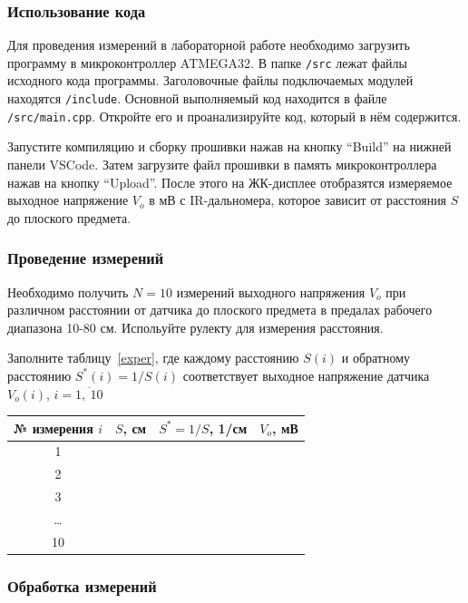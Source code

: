 \documentclass[12pt]{article}
\begin{document}
\subsubsection{Использование кода}

Для проведения измерений в лабораторной работе необходимо загрузить программу в микроконтроллер ATMEGA32. В папке \texttt{/src} лежат файлы исходного кода программы. Заголовочные файлы подключаемых модулей находятся \texttt{/include}. Основной выполняемый код находится в файле \texttt{/src/main.cpp}. Откройте его и проанализируйте код, который в нём содержится.

Запустите компиляцию и сборку прошивки нажав на кнопку ``Build'' на нижней панели VSCode. Затем загрузите файл прошивки в память микроконтроллера нажав на кнопку ``Upload''. После этого на ЖК-дисплее отобразятся измеряемое выходное напряжение \(V_o\) в мВ с IR-дальномера, которое зависит от расстояния \(S\) до плоского предмета.

\subsubsection{Проведение измерений}
Необходимо получить \(N=10\) измерений выходного напряжения \(V_o\) при различном расстоянии от датчика до плоского предмета в предалах рабочего диапазона 10-80 см. Испольуйте рулекту для измерения расстояния.

Заполните таблицу~\ref{exper}, где каждому расстоянию \(S(i)\) и обратному расстоянию \(S^*(i)=1/S(i)\) соответствует выходное напряжение датчика \(V_o(i)\), \(i=\overline{1,\:10}\) 

\begin{table}[H]
    \centering
    \caption{Экспериментальные измерения \(S\) и \(V_o\)}\label{exper}
    \begin{longtable}{c|c|c|c}
        \toprule
        № измерения \(i\) & \(S\), см & \(S^*=1/S\), 1/см & \(V_o\), мВ \\
        \midrule
        1 &&& \\
        \hline
        2 &&& \\
        \hline
        3 &&& \\
        \hline
        \dots &&& \\
        \hline
        10 &&& \\
        \bottomrule
    \end{longtable}
\end{table}

\subsubsection{Обработка измерений}
\end{document}
